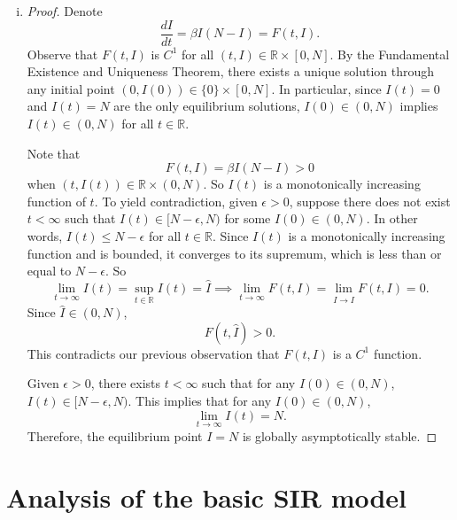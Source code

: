 \documentclass[12pt]{article}
\begin{document}
\begin{enumerate}[(a)]
\begin{enumerate}[(i)]
  \item \SIanalQbii
    
    {\color{blue}
      \begin{proof}
        Denote
\begin{equation*}
\frac{dI}{dt} = \beta I (N-I) = F(t, I).
\end{equation*}
Observe that $F(t, I)$ is $C^1$ for all $(t, I) \in \mathbb{R} \times [0, N]$. 
By the Fundamental Existence and Uniqueness Theorem, there exists a unique solution through any initial point $(0, I(0)) \in \{ 0\} \times [0, N]$.
In particular, since $I(t) = 0$ and $I(t) = N$ are the only equilibrium solutions, $I(0) \in (0, N)$ implies $I(t) \in (0, N)$ for all $t \in \mathbb{R}$.

Note that
\begin{equation*}
F(t, I) = \beta I (N-I) > 0
\end{equation*}
when $(t, I(t)) \in \mathbb{R} \times (0, N)$. 
So $I(t)$ is a monotonically increasing function of $t$.
To yield contradiction, given $\epsilon > 0$, suppose there does not exist $t < \infty$ such that $I(t) \in [N - \epsilon, N)$ for some $I(0) \in (0, N)$.
In other words, $I(t) \leq N-\epsilon$ for all $t \in \mathbb{R}$.
Since $I(t)$ is a monotonically increasing function and is bounded, it converges to its supremum, which is less than or equal to $N-\epsilon$. So
\begin{equation*}
\lim_{t \to \infty} I(t) = \sup_{t \in \mathbb{R}} I(t) = \hat{I} \implies \lim_{t \to \infty} F(t, I) = \lim_{I \to \hat{I}} F(t, I) = 0.
\end{equation*}
Since $\hat{I} \in (0, N)$,
\begin{equation*}
F(t, \hat{I}) > 0.
\end{equation*}
This contradicts our previous observation that $F(t, I)$ is a $C^1$ function. 

Given $\epsilon > 0$, there exists $t < \infty$ such that for any $I(0) \in (0, N)$, $I(t) \in [N - \epsilon, N)$. 
This implies that for any $I(0) \in (0, N)$,
\begin{equation*}
\lim_{t \to \infty} I(t) = N.
\end{equation*}
Therefore, the equilibrium point $I=N$ is globally asymptotically stable.
      \end{proof}
    }
    
  \end{enumerate}
\end{enumerate}

\section{Analysis of the basic SIR  model}
\end{document}
